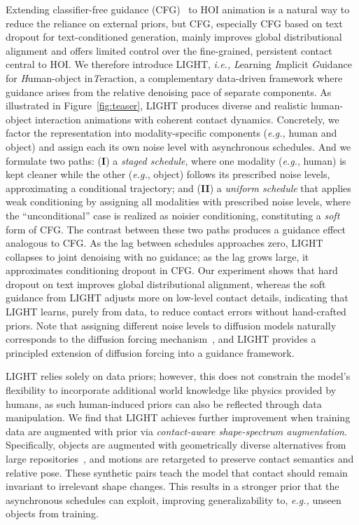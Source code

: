 Extending classifier-free guidance (CFG)~\citep{ho2022classifier} to HOI animation is a natural way to reduce the reliance on external priors, but CFG, especially CFG based on text dropout for text-conditioned generation, mainly improves global distributional alignment and offers limited control over the fine-grained, persistent contact central to HOI.
We therefore introduce LIGHT, \textit{i.e.,} \textit{L}earning \textit{I}mplicit \textit{G}uidance for \textit{H}uman-object in\textit{T}eraction, a complementary data-driven framework where guidance arises from the relative denoising pace of separate components. As illustrated in Figure~\ref{fig:teaser}, LIGHT produces diverse and realistic human-object interaction animations with coherent contact dynamics. Concretely, we factor the representation into modality-specific components (\textit{e.g.,} human and object) and assign each its own noise level with asynchronous schedules. And we formulate two paths:
(\textbf{I}) a \textit{staged schedule}, where one modality (\textit{e.g.}, human) is kept cleaner while the other (\textit{e.g.}, object) follows its prescribed noise levels, approximating a conditional trajectory; and
(\textbf{II}) a \textit{uniform schedule} that applies weak conditioning by assigning all modalities with prescribed noise levels, where the ``unconditional'' case is realized as noisier conditioning, constituting a \textit{soft} form of CFG. The contrast between these two paths produces a guidance effect analogous to CFG. As the lag between schedules approaches zero, LIGHT collapses to joint denoising with no guidance; as the lag grows large, it approximates conditioning dropout in CFG. Our experiment shows that hard dropout on text improves global distributional alignment, whereas the soft guidance from LIGHT adjusts more on low-level contact details, indicating that LIGHT learns, purely from data, to reduce contact errors without hand-crafted priors. Note that assigning different noise levels to diffusion models naturally corresponds to the diffusion forcing mechanism~\citep{chen2024diffusion}, and LIGHT provides a principled extension of diffusion forcing into a guidance framework.

LIGHT relies solely on data priors; however, this does not constrain the model’s flexibility to incorporate additional world knowledge like physics provided by humans, as such human-induced priors can also be reflected through data manipulation. We find that LIGHT achieves further improvement when training data are augmented with prior via \textit{contact-aware shape-spectrum augmentation}. Specifically, objects are augmented with geometrically diverse alternatives from large repositories~\citep{chang2015shapenet, deitke2023objaverse}, and motions are retargeted to preserve contact semantics and relative pose. These synthetic pairs teach the model that contact should remain invariant to irrelevant shape changes. This results in a stronger prior that the asynchronous schedules can exploit, improving generalizability to, \textit{e.g.,}  unseen objects from training.

